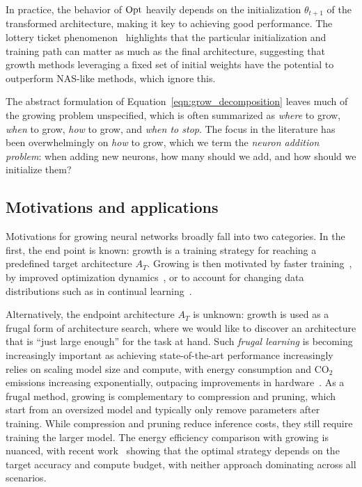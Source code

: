 In practice, the behavior of $\operatorname*{\text{Opt}}$ heavily depends on the initialization $\theta_{t+1}$ of the transformed architecture, making it key to achieving good performance. The lottery ticket phenomenon~\citep{frankle_lottery_2019,chen_elastic_2021} highlights that the particular initialization and training path can matter as much as the final architecture, suggesting that growth methods leveraging a fixed set of initial weights have the potential to outperform NAS-like methods, which ignore this.

The abstract formulation of Equation~\eqref{eqn:grow_decomposition} leaves much of the growing problem unspecified, which is often summarized as \emph{where} to grow, \emph{when} to grow, \emph{how} to grow, and \emph{when to stop}. The focus in the literature has been overwhelmingly on \emph{how} to grow, which we term the \emph{neuron addition problem}: when adding new neurons, how many should we add, and how should we initialize them?

\subsection{Motivations and applications}

Motivations for growing neural networks broadly fall into two categories. In the first, the end point is known: growth is a training strategy for reaching a predefined target architecture $A_T$. Growing is then motivated by faster training~\citep{evci_gradmax_2022,yuan_accelerated_2023}, by improved optimization dynamics~\citep{wu_when_2024,caillon_growing_2021}, or to account for changing data distributions such as in continual learning~\citep{yoon_lifelong_2018,li_learn_2019,yang_grown_2021}.

Alternatively, the endpoint architecture $A_T$ is unknown: growth is used as a frugal form of architecture search, where we would like to discover an architecture that is ``just large enough'' for the task at hand. Such \emph{frugal learning} is becoming increasingly important as achieving state-of-the-art performance increasingly relies on scaling model size and compute, with energy consumption and $\mathrm{CO_2}$ emissions increasing exponentially, outpacing improvements in hardware~\citep{thompson_deep_2021,morand_environmental_2025}. As a frugal method, growing is complementary to compression and pruning, which start from an oversized model and typically only remove parameters after training. While compression and pruning reduce inference costs, they still require training the larger model. The energy efficiency comparison with growing is nuanced, with recent work~\citep{boumendil_grow_2023} showing that the optimal strategy depends on the target accuracy and compute budget, with neither approach dominating across all scenarios.

